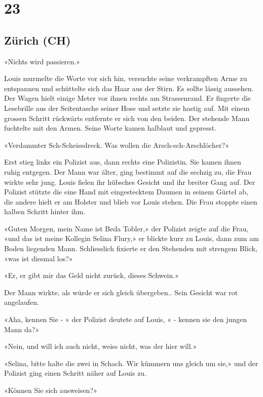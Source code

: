  \chapter{23}

\section{Zürich (CH)} 



«Nichts wird passieren.»

Louis murmelte die Worte vor sich hin, versuchte seine verkrampften Arme zu entspannen und schüttelte sich das Haar aus der Stirn. Es sollte lässig aussehen. Der Wagen hielt einige Meter vor ihnen rechts am Strassenrand. Er fingerte die Lesebrille aus der Seitentasche seiner Hose und setzte sie hastig auf. Mit einem grossen Schritt rückwärts entfernte er sich von den beiden. Der stehende Mann fuchtelte mit den Armen. Seine Worte kamen halblaut und gepresst.

«Verdammter Sch-Scheiss\-dreck. Was wollen die
Arsch-sch-Arsch\-löcher?»

Erst stieg links ein Polizist aus, dann rechts eine Polizistin. Sie
kamen ihnen ruhig entgegen. Der Mann war älter, ging bestimmt auf die
sechzig zu, die Frau wirkte sehr jung. Louis fielen ihr hübsches Gesicht
und ihr breiter Gang auf. Der Polizist stützte die eine Hand mit
eingestecktem Daumen in seinem Gürtel ab, die andere hielt er am Holster  
und blieb vor Louis stehen. Die Frau stoppte einen halben Schritt hinter ihm.

«Guten Morgen, mein Name ist Beda Tobler,» der Polizist zeigte auf die
Frau, «und das ist meine Kollegin Selina Flury,» er blickte kurz zu
Louis, dann zum am Boden liegenden Mann. Schliesslich fixierte er den
Stehenden mit strengem Blick, «was ist diesmal los?»

«Er, er gibt mir das Geld nicht zurück, dieses Schwein.»

Der Mann wirkte, als würde er sich gleich übergeben.. Sein Gesicht war rot
angelaufen.

«Aha, kennen Sie - » der Polizist deutete auf Louis, « - kennen sie den jungen Mann da?»

«Nein, und will ich auch nicht, weiss nicht, was der hier will.»

«Selina, bitte halte die zwei in Schach. Wir kümmern uns gleich um sie,»
und der Polizist ging einen Schritt näher auf Louis zu.

«Können Sie sich ausweisen?»

